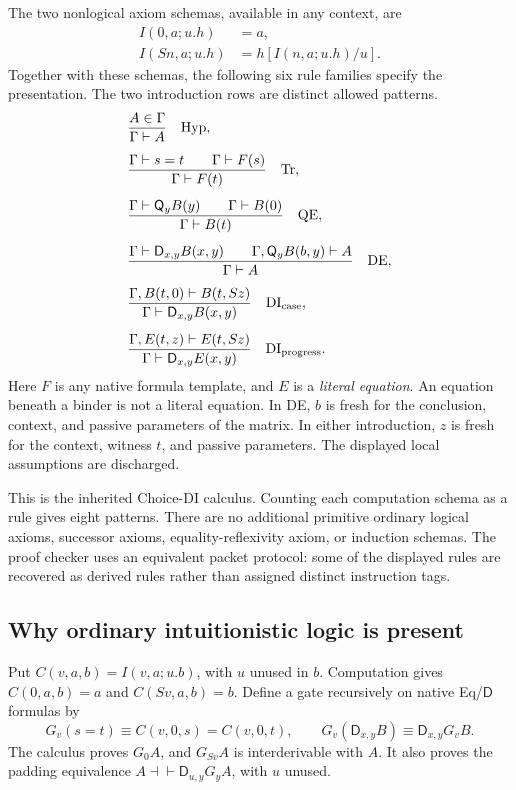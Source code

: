 \documentclass[11pt]{article}
\theoremstyle{definition}\newtheorem{definition}[theorem]{Definition}
\theoremstyle{remark}\newtheorem{remark}[theorem]{Remark}
\newcommand{\D}{\mathsf D}
\newcommand{\Q}{\mathsf Q}
\begin{document}
The two nonlogical axiom schemas, available in any context, are
\begin{align}
 I(0,a;u.h)&=a,\tag{C0}\label{main:c0}\\
 I(Sn,a;u.h)&=h[I(n,a;u.h)/u].\tag{CS}\label{main:cs}
\end{align}
Together with these schemas, the following six rule families specify the
presentation. The two introduction rows are distinct allowed patterns.
\begin{align*}
 &\frac{A\in\Gamma}{\Gamma\vdash A}\quad\mathrm{Hyp},\\[5pt]
 &\frac{\Gamma\vdash s=t\qquad\Gamma\vdash F(s)}
        {\Gamma\vdash F(t)}\quad\mathrm{Tr},\\[5pt]
 &\frac{\Gamma\vdash\Q_y B(y)\qquad\Gamma\vdash B(0)}
        {\Gamma\vdash B(t)}\quad\mathrm{QE},\\[5pt]
 &\frac{\Gamma\vdash\D_{x,y}B(x,y)\qquad
        \Gamma,\Q_y B(b,y)\vdash A}{\Gamma\vdash A}\quad\mathrm{DE},\\[5pt]
 &\frac{\Gamma,B(t,0)\vdash B(t,Sz)}
        {\Gamma\vdash\D_{x,y}B(x,y)}\quad\mathrm{DI}_{\rm case},\\[5pt]
 &\frac{\Gamma,E(t,z)\vdash E(t,Sz)}
        {\Gamma\vdash\D_{x,y}E(x,y)}\quad\mathrm{DI}_{\rm progress}.
\end{align*}
Here \(F\) is any native formula template, and \(E\) is a \emph{literal
equation}. An equation beneath a binder is not a literal equation.
In DE, \(b\) is fresh for the conclusion, context, and passive parameters
of the matrix. In either introduction, \(z\) is fresh for the context,
witness \(t\), and passive parameters. The displayed local assumptions
are discharged.

This is the inherited Choice-DI calculus. Counting each computation schema
as a rule gives eight patterns. There are no additional primitive ordinary
logical axioms, successor axioms, equality-reflexivity axiom, or induction
schemas. The proof checker uses an equivalent packet protocol: some of the
displayed rules are recovered as derived rules rather than assigned distinct
instruction tags.

\subsection{Why ordinary intuitionistic logic is present}

Put \(C(v,a,b)=I(v,a;u.b)\), with \(u\) unused in \(b\). Computation gives
\(C(0,a,b)=a\) and \(C(Sv,a,b)=b\). Define a gate recursively on native
Eq/\(\D\) formulas by
\[
 G_v(s=t)\equiv C(v,0,s)=C(v,0,t),\qquad
 G_v(\D_{x,y}B)\equiv\D_{x,y}G_vB.
\]
The calculus proves \(G_0A\), and \(G_{Sv}A\) is interderivable with \(A\).
It also proves the padding equivalence
\(A\dashv\vdash\D_{u,y}G_yA\), with \(u\) unused.
\end{document}
